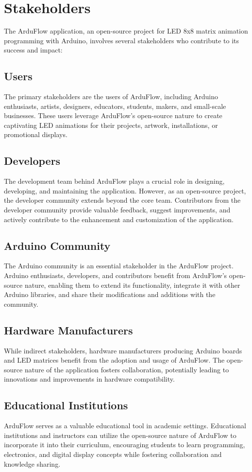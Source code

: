 \documentclass[a4paper, 11pt]{article}
\begin{document}
\section{Stakeholders}

The ArduFlow application, an open-source project for LED 8x8 matrix animation programming with Arduino, involves several stakeholders who contribute to its success and impact:

\subsection{Users}
    The primary stakeholders are the users of ArduFlow, including Arduino enthusiasts, artists, designers, educators, students, makers, and small-scale businesses. These users leverage ArduFlow's open-source nature to create captivating LED animations for their projects, artwork, installations, or promotional displays.
    \subsection{Developers}

     The development team behind ArduFlow plays a crucial role in designing, developing, and maintaining the application. However, as an open-source project, the developer community extends beyond the core team. Contributors from the developer community provide valuable feedback, suggest improvements, and actively contribute to the enhancement and customization of the application.
     \subsection{Arduino Community}
     The Arduino community is an essential stakeholder in the ArduFlow project. Arduino enthusiasts, developers, and contributors benefit from ArduFlow's open-source nature, enabling them to extend its functionality, integrate it with other Arduino libraries, and share their modifications and additions with the community.
    \subsection{Hardware Manufacturers}
    While indirect stakeholders, hardware manufacturers producing Arduino boards and LED matrices benefit from the adoption and usage of ArduFlow. The open-source nature of the application fosters collaboration, potentially leading to innovations and improvements in hardware compatibility.
    \subsection{Educational Institutions}
    ArduFlow serves as a valuable educational tool in academic settings. Educational institutions and instructors can utilize the open-source nature of ArduFlow to incorporate it into their curriculum, encouraging students to learn programming, electronics, and digital display concepts while fostering collaboration and knowledge sharing.
\end{document}
